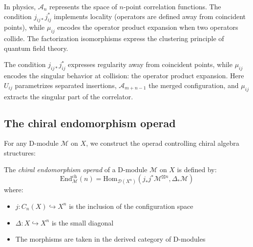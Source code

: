 \begin{remark}
In physics, $\mathcal{A}_n$ represents the space of $n$-point correlation functions. The condition 
$j_{ij*}j_{ij}^*$ implements locality (operators are defined away from coincident points), while 
$\mu_{ij}$ encodes the operator product expansion when two operators collide. The factorization 
isomorphisms express the clustering principle of quantum field theory.
\end{remark}

\begin{remark}
The condition $j_{ij*}j_{ij}^*$ expresses regularity away from coincident points, while $\mu_{ij}$ encodes the singular behavior at collision: the operator product expansion.  Here $U_{ij}$ parametrizes separated insertions, $\mathcal{A}_{m+n-1}$ the merged configuration, and $\mu_{ij}$ extracts the singular part of the correlator.
\end{remark}

\subsection{The chiral endomorphism operad}
 
For any D-module $\mathcal{M}$ on $X$, we construct the operad controlling chiral algebra structures:
 
\begin{definition}\label{def:chiral-endo}
The \emph{chiral endomorphism operad} of a D-module $\mathcal{M}$ on $X$ is defined by:
\[
\text{End}_{\mathcal{M}}^{\text{ch}}(n) = \text{Hom}_{\mathcal{D}(X^n)}\left(j_*j^*\mathcal{M}^{\boxtimes n}, \Delta_*\mathcal{M}\right)
\]
where:
\begin{itemize}
\item $j: C_n(X) \hookrightarrow X^n$ is the inclusion of the configuration space
\item $\Delta: X \hookrightarrow X^n$ is the small diagonal
\item The morphisms are taken in the derived category of D-modules
\end{itemize}
\end{definition}
 
